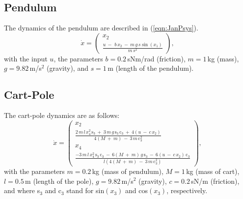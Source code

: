 \documentclass[letterpaper, 10 pt, conference]{ieeeconf}  %
\begin{document}
\subsection{Pendulum}
The dynamics of the pendulum are described in (\ref{eqn:JanPsys}).
\begin{equation}\label{eqn:JanPsys}
\dot{x}=
	\left( {\begin{array}{cc}
		x_2\\
		\tfrac{u \: - \: \,b\,x_2 \: - \: m\,g\,s\sin(x_1)}{m\,s^2}\end{array} } \right),
\end{equation}
with the input $u$, the parameters $b=0.2$\,sNm/rad (friction), $m=1$\,kg (mass), $g=9.82$\,m/s$^2$ (gravity), and $s=1$\,m (length of the pendulum).
\subsection{Cart-Pole}
The cart-pole dynamics are as follows:
\begin{equation}\label{eqn:JanCPsys}
\dot{x}=
\left( {\begin{array}{cc}
	x_2\\
	\frac{2\,m\,l\,x_4^2\,\text{s}_3 \: + \: 3\,m\,g\,\text{s}_3\,\text{c}_3 \: + \: 4(u \: - \: c\,x_2)}{4(M \: + \: m) \: - \: 3\,m\,\text{c}_3^2}\\
	x_4\\
	\frac{-3\,m\,l\,x_4^2\,\text{s}_3\,\text{c}_3 \: - \: 6(M \: + \: m)\,g\,\text{s}_3 \: - \: 6(u \: - \: c\,x_2)\,\text{c}_3}{l(4(M \: + \: m) \: - \: 3\,m\,\text{c}_3^2)}\end{array} } \right),
\end{equation}
with the parameters $m=0.2$\,kg (mass of pendulum),  $M=1$\,kg (mass of cart), $l=0.5$\,m (length of the pole), $g=9.82$\,m/s$^2$ (gravity), $c=0.2$\,sN/m (friction), and where s$_3$ and c$_3$ stand for sin$(x_3)$ and cos$(x_3)$, respectively.

\end{document}

